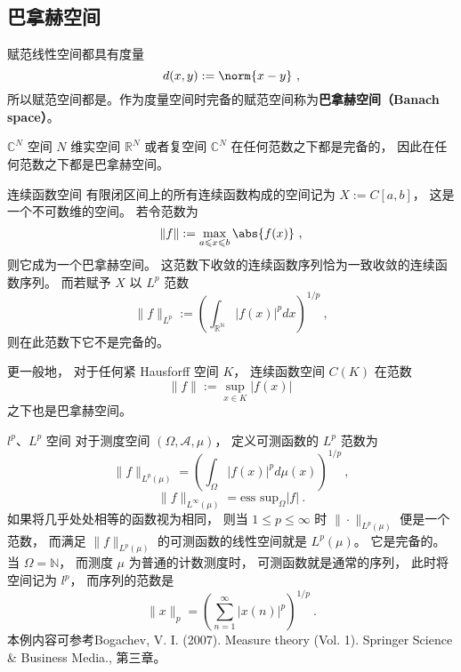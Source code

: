 

\subsection{巴拿赫空间}

赋范线性空间都具有度量
\begin{equation}
d(x,y) := \norm{x-y}~,
\end{equation}
所以赋范空间都是。作为度量空间时完备的赋范空间称为\textbf{巴拿赫空间（Banach space）}。

\begin{example}{$\mathbb C^N$ 空间}
$N$ 维实空间 $\mathbb R^N$ 或者复空间 $\mathbb C^N$ 在任何范数之下都是完备的， 因此在任何范数之下都是巴拿赫空间。
\end{example}

\begin{example}{连续函数空间}
有限闭区间上的所有连续函数构成的空间记为 $X := C[a, b]$， 这是一个不可数维的空间。 若令范数为
$$
\|{f}\|:= \max_{a \leqslant x \leqslant b} \abs{f(x)}~,
$$
则它成为一个巴拿赫空间。 这范数下收敛的连续函数序列恰为一致收敛的连续函数序列。 而若赋予 $X$ 以 $L^p$ 范数
$$
\|f\|_{L^p}:=\left(\int_{\mathbb{R^N}}|f(x)|^pdx\right)^{1/p}~,
$$
则在此范数下它不是完备的。

更一般地， 对于任何紧 Hausforff 空间 $K$， 连续函数空间 $C(K)$ 在范数
$$
\|f\|:=\sup_{x\in K}|f(x)|~
$$
之下也是巴拿赫空间。
\end{example}

\begin{example}{$l^p$、$L^p$ 空间}
对于测度空间 $(\Omega,\mathcal{A},\mu)$， 定义可测函数的 $L^p$ 范数为
$$
\|f\|_{L^p(\mu)}=\left(\int_\Omega |f(x)|^pd\mu(x)\right)^{1/p}~,
$$
$$
\|f\|_{L^\infty(\mu)}=\text{ess sup}_{\Omega}|f|~.
$$
如果将几乎处处相等的函数视为相同， 则当 $1\leq p\leq\infty$ 时 $\|\cdot\|_{L^p(\mu)}$ 便是一个范数， 而满足 $\|f\|_{L^p(\mu)}$ 的可测函数的线性空间就是 $L^p(\mu)$。 它是完备的。 当 $\Omega=\mathbb{N}$， 而测度 $\mu$ 为普通的计数测度时， 可测函数就是通常的序列， 此时将空间记为 $l^p$， 而序列的范数是
$$
\|x\|_p=\left(\sum_{n=1}^\infty|x(n)|^p\right)^{1/p}~.
$$
本例内容可参考Bogachev, V. I. (2007). Measure theory (Vol. 1). Springer Science \& Business Media., 第三章。
\end{example}

